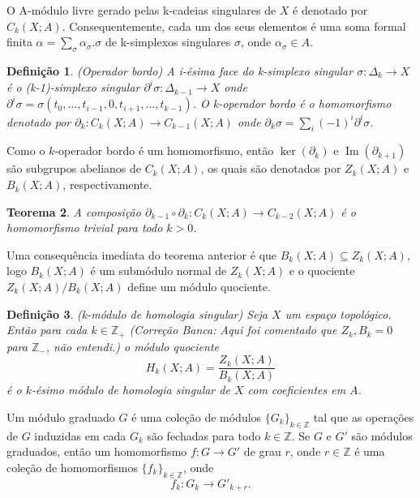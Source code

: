 \documentclass[12pt]{book}
\newtheorem{teorema}{Teorema}[section]
\newtheorem{definicao}[teorema]{Definição}
\DeclareMathOperator{\Ima}{Im}
\newcommand{\bordo}[1]{\partial_{#1}}
\newcommand{\cadeia}[2]{C_{#1}(#2; A)}
\newcommand{\colecao}[1]{\{#1_{k} \}_{k\in \inteiros}}
\newcommand{\homologia}[2]{H_{#1}(#2;A)}
\newcommand{\imagem}[1]{\Ima(#1)}
\newcommand{\imagembordo}[2]{B_{#1}(#2;A)}
\newcommand{\inteiros}{\mathbb{Z}}
\newcommand{\inteirospos}{\inteiros_{+}}
\newcommand{\kernelbordo}[2]{Z_{#1}(#2;A)}
\newcommand{\alerta}[1]{{\color{red}#1}}
\newcommand{\correcaobanca}[1]{\alerta{(Correção Banca: #1)}}
\begin{document}
	O A-módulo livre gerado pelas k-cadeias singulares de $X$ é denotado por $\cadeia{k}{X}$. Consequentemente, cada um dos seus elementos é uma soma formal finita $\alpha = \sum_{\sigma} \alpha_{\sigma}.\sigma $ de k-simplexos singulares $\sigma$, onde $\alpha_{\sigma} \in A$.
	
	\begin{definicao}
		(Operador bordo) A i-ésima face do k-simplexo singular $\sigma: \Delta_{k} \to X$ é o (k-1)-simplexo singular $\partial^{i}\sigma:\Delta_{k-1} \to X$ onde $\partial^{i}\sigma = \sigma(t_{0}, \dots, t_{i-1},0,t_{i+1}, \dots, t_{k-1})$. O k-operador bordo é o homomorfismo denotado por $\bordo{k}: \cadeia{k}{X} \to \cadeia{k-1}{X}$ onde $\bordo{k}\sigma = \sum_{i} (-1)^{i}\partial^{i}\sigma$.
	\end{definicao}
	
	Como o $k$-operador bordo é um homomorfismo, então $\ker(\bordo{k})$ e $\imagem{\bordo{k+1}}$ são subgrupos abelianos de $\cadeia{k}{X}$, os quais são denotados por $\kernelbordo{k}{X}$ e $\imagembordo{k}{X}$, respectivamente.
	
	\begin{teorema}
		A composição $\bordo{k-1}\circ\bordo{k}: \cadeia{k}{X} \to \cadeia{k-2}{X}$ é o homomorfismo trivial para todo $k>0$.
	\end{teorema}
	
	Uma consequência imediata do teorema anterior é que $\imagembordo{k}{X} \subseteq \kernelbordo{k}{X}$, logo $\imagembordo{k}{X}$ é um submódulo normal de $\kernelbordo{k}{X}$ e o quociente $\kernelbordo{k}{X}/\imagembordo{k}{X}$ define um módulo quociente.
	
	\begin{definicao}
		(k-módulo de homologia singular) Seja $X$ um espaço topológico. Então para cada $k \in \inteirospos$ \correcaobanca{Aqui foi comentado que $Z_k, B_k=0$ para $\inteiros_{-}$, não entendi.} o módulo quociente
		$$
		\homologia{k}{X} = \frac{\kernelbordo{k}{X}}{\imagembordo{k}{X}}
		$$
		é o $k$-ésimo módulo de homologia singular de $X$ com coeficientes em $A$.
	\end{definicao}
	
	Um módulo graduado $G$ é uma coleção de módulos $\colecao{G}$ tal que as operações de $G$ induzidas em cada $G_{k}$ são fechadas para todo $k \in \inteiros$. Se $G$ e $G'$ são módulos graduados, então um homomorfismo $f:G\to G'$ de grau $r$, onde $r \in \inteiros$ é uma coleção de homomorfismos $\colecao{f}$, onde 
	$$
	f_{k}:G_{k}\to G'_{k+r}.
	$$
	
\end{document}
